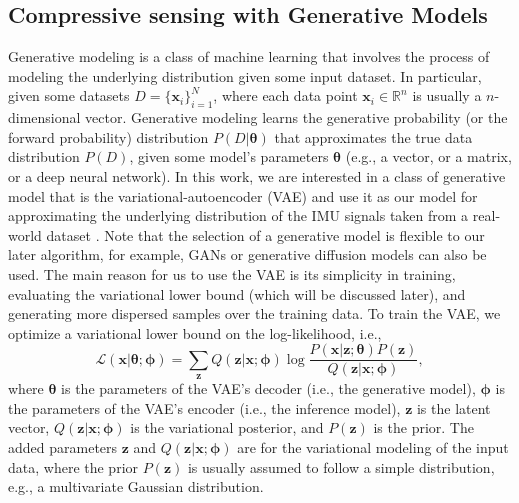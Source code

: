 \documentclass[conference, 10pt]{IEEEtran}
\begin{document}
\subsection{Compressive sensing with Generative Models}
Generative modeling is a class of machine learning that involves the process of modeling the underlying distribution given some input dataset.  In particular, given some datasets $D = \{\mathbf{x}_i\}_{i=1}^{N}$, where each data point $\mathbf{x}_{i} \in \mathbb{R}^n$ is usually a $n$-dimensional vector. Generative modeling learns the generative probability (or the forward probability) distribution $P(D|\bm{\theta})$ that approximates the true data distribution $P(D)$, given some model's parameters $\bm{\theta}$ (e.g., a vector, or a matrix, or a deep neural network). In this work, we are interested in a class of generative model that is the variational-autoencoder (VAE) \cite{kingma2013auto} and use it as our model for approximating the underlying distribution of the IMU signals taken from a real-world dataset \cite{huang2018deep}. Note that the selection of a generative model is flexible to our later algorithm, for example, GANs or generative diffusion models can also be used. The main reason for us to use the VAE is its simplicity in training, evaluating the variational lower bound (which will be discussed later), and generating more dispersed samples over the training data.
To train the VAE, we optimize a variational lower bound on the log-likelihood, i.e., 
\begin{equation}
\label{eq:variational-lower-bound}
\mathcal{L}({\mathbf{x}| \bm{\theta; \phi}}) = \sum_{\mathbf{z}} Q(\mathbf{z}|\mathbf{x}; \bm{\phi}) \log \frac{P(\mathbf{x}| \mathbf{z}; \bm{\theta}) P(\mathbf{z})}{Q(\mathbf{z}|\mathbf{x}; \bm{\phi})},
\end{equation}
where $\bm{\theta}$ is the parameters of the VAE's decoder (i.e., the generative model), $\bm{\phi}$ is the parameters of the VAE's encoder (i.e., the inference model), $\mathbf{z}$ is the latent vector,  $Q(\mathbf{z}|\mathbf{x}; \bm{\phi})$ is the variational posterior, and $P(\mathbf{z})$ is the prior. The added parameters $\mathbf{z}$ and $Q(\mathbf{z}|\mathbf{x}; \bm{\phi})$ are for the variational modeling of the input data, where the prior $P(\mathbf{z})$ is usually assumed to follow a simple distribution, e.g., a multivariate Gaussian distribution. 
\end{document}
